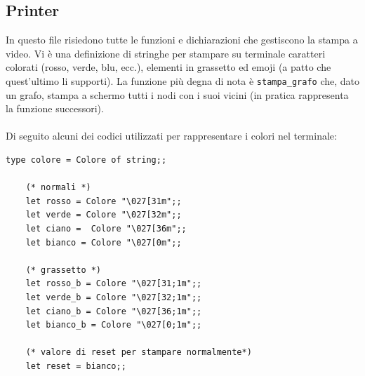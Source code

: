 \subsection{Printer}

In questo file risiedono tutte le funzioni e dichiarazioni che gestiscono la stampa a video. Vi è una definizione di stringhe per stampare su terminale caratteri colorati (rosso, verde, blu, ecc.),
elementi in grassetto ed emoji (a patto che quest'ultimo li supporti). La funzione più degna di nota è \lstinline[style=cmd]|stampa_grafo| che, dato un grafo, stampa a schermo tutti i nodi con i suoi vicini (in pratica rappresenta la funzione successori).\\
\ \\
Di seguito alcuni dei codici utilizzati per rappresentare i colori nel terminale: \\

\begin{lstlisting}[style=caml, caption={Codici per i colori ed elementi in grassetto}]
	type colore = Colore of string;;
	
	(* normali *)
	let rosso = Colore "\027[31m";;
	let verde = Colore "\027[32m";;
	let ciano =  Colore "\027[36m";;
	let bianco = Colore "\027[0m";;
	
	(* grassetto *)
	let rosso_b = Colore "\027[31;1m";;
	let verde_b = Colore "\027[32;1m";;
	let ciano_b = Colore "\027[36;1m";;
	let bianco_b = Colore "\027[0;1m";;
	
	(* valore di reset per stampare normalmente*)
	let reset = bianco;;
\end{lstlisting}

